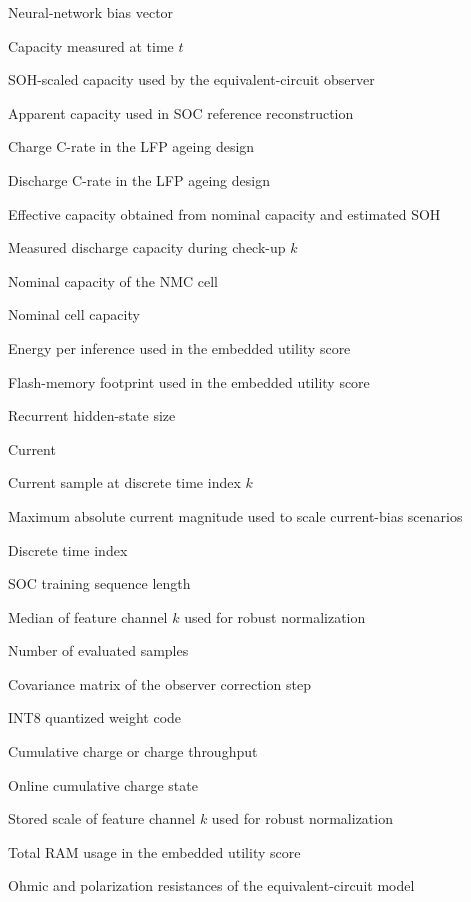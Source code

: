 \documentclass[
    a4paper,
    12pt,
    titlepage,
    bibliography=totoc,
    twoside=on,
    parskip=false,
    numbers=noenddot,
    cleardoublepage=empty,
    DIV=12,
    BCOR=12.0mm,
    headheight=36pt,
    headings=openright
]{scrreprt}
\begin{document}
\begin{description}[style=nextline,leftmargin=3.2cm]
\item[$b$] Neural-network bias vector
\item[$C(t)$] Capacity measured at time $t$
\item[$C_b$] SOH-scaled capacity used by the equivalent-circuit observer
\item[$C_\mathrm{app}$] Apparent capacity used in SOC reference reconstruction
\item[$C_\mathrm{chg}$] Charge C-rate in the LFP ageing design
\item[$C_\mathrm{dis}$] Discharge C-rate in the LFP ageing design
\item[$C_\mathrm{eff}$] Effective capacity obtained from nominal capacity and estimated SOH
\item[$C_k$] Measured discharge capacity during check-up $k$
\item[$C_\mathrm{N}$] Nominal capacity of the NMC cell
\item[$C_\mathrm{nom}$] Nominal cell capacity
\item[$E$] Energy per inference used in the embedded utility score
\item[$F$] Flash-memory footprint used in the embedded utility score
\item[$H$] Recurrent hidden-state size
\item[$I$] Current
\item[$I_k$] Current sample at discrete time index $k$
\item[$|I|_{\max}$] Maximum absolute current magnitude used to scale current-bias scenarios
\item[$k$] Discrete time index
\item[$L_\mathrm{SOC}$] SOC training sequence length
\item[$m_k$] Median of feature channel $k$ used for robust normalization
\item[$n$] Number of evaluated samples
\item[$P$] Covariance matrix of the observer correction step
\item[$q$] INT8 quantized weight code
\item[$Q$] Cumulative charge or charge throughput
\item[$Q_c$] Online cumulative charge state
\item[$s_k$] Stored scale of feature channel $k$ used for robust normalization
\item[$R$] Total RAM usage in the embedded utility score
\item[$R_0,R_1,R_2$] Ohmic and polarization resistances of the equivalent-circuit model

\end{description}
\end{document}
